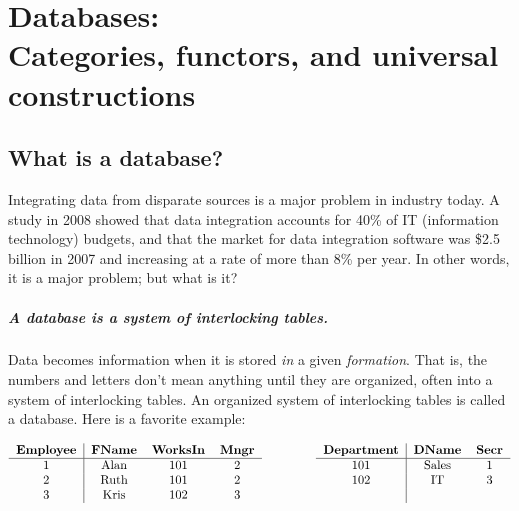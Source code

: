 \documentclass[7Sketches]{subfiles}
\begin{document}
\setcounter{chapter}{2}%
\chapter[Databases: Categories, functors, and (co)limits]{Databases:\\Categories, functors, and universal constructions}%
\label{chap.databases}


\section{What is a database?}%
\label{sec.C2_motivation}
%

Integrating data from disparate sources is a major problem in industry today. A
study in 2008 \cite{bernstein.Hass:2008a} showed that data integration accounts for 40\% of IT (information technology) budgets, and that the market for
data integration software was \$2.5 billion in 2007 and increasing at a rate of
more than 8\% per year. In other words, it is a major problem; but what is it?


\paragraph{A database is a system of interlocking tables.}%

Data becomes information when it is stored \emph{in} a given \emph{formation}. That is, the numbers and letters don't mean anything until they are organized, often into a system of interlocking tables. An organized system of interlocking tables is called a database. Here is a favorite example:

\begin{equation}%
\label{eqn.fav_ex_db}
\begin{tabular}{ c | c  c  c}
  \textbf{Employee}&\textbf{FName}&\textbf{WorksIn}&\textbf{Mngr}\\\hline
  1&Alan&101&2\\
  2&Ruth&101&2\\
  3&Kris&102&3
\end{tabular}
\hspace{.6in}
\begin{tabular}{ c | c  c}
  \textbf{Department}&\textbf{DName}&\textbf{Secr}\\\hline
  101&Sales&1\\
  102&IT&3\\~
\end{tabular}
\end{equation}
\end{document}
